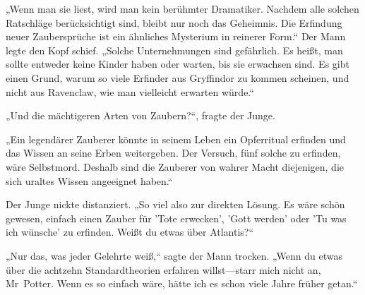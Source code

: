 „Wenn man sie liest, wird man kein berühmter Dramatiker. Nachdem alle solchen Ratschläge berücksichtigt sind, bleibt nur noch das Geheimnis. Die Erfindung neuer Zaubersprüche ist ein ähnliches Mysterium in reinerer Form.“
Der Mann legte den Kopf schief.
„Solche Unternehmungen sind gefährlich. Es heißt, man sollte entweder keine Kinder haben oder warten, bis sie erwachsen sind. Es gibt einen Grund, warum so viele Erfinder aus Gryffindor zu kommen scheinen, und nicht aus Ravenclaw, wie man vielleicht erwarten würde.“

„Und die mächtigeren Arten von Zaubern?“, fragte der Junge.

„Ein legendärer Zauberer könnte in seinem Leben ein Opferritual erfinden und das Wissen an seine Erben weitergeben. Der Versuch, fünf solche zu erfinden, wäre Selbstmord. Deshalb sind die Zauberer von wahrer Macht diejenigen, die sich uraltes Wissen angeeignet haben.“

Der Junge nickte distanziert.
„So viel also zur direkten Lösung. Es wäre schön gewesen, einfach einen Zauber für 'Tote erwecken', 'Gott werden' oder 'Tu was ich wünsche' zu erfinden. Weißt du etwas über Atlantis?“

„Nur das, was jeder Gelehrte weiß,“ sagte der Mann trocken. „Wenn du etwas über die achtzehn Standardtheorien erfahren willst—starr mich nicht an, Mr~Potter. Wenn es so einfach wäre, hätte ich es schon viele Jahre früher getan.“

